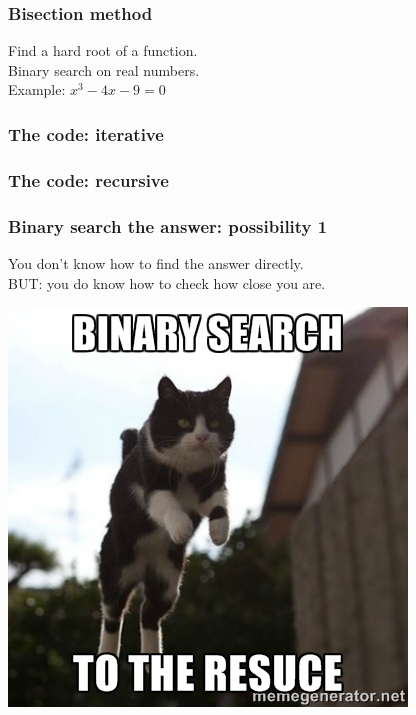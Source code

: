 \documentclass[12pt]{beamer}
\begin{document}
\begin{frame}
	\frametitle{Bisection method}
	Find a hard root of a function.\\
	Binary search on real numbers. \\
	Example: $x^3 - 4x - 9 = 0$
\end{frame}

\begin{frame}
	\frametitle{The code: iterative}
	
\end{frame}

\begin{frame}
	\frametitle{The code: recursive}
	
\end{frame}

\begin{frame}
	\frametitle{Binary search the answer: possibility 1}
	You don't know how to find the answer directly.\\
	BUT: you do know how to check how close you are. \\
	\begin{center}
		\includegraphics[scale=0.3]{img/catrescue.jpg}
	\end{center}
\end{frame}
\end{document}
